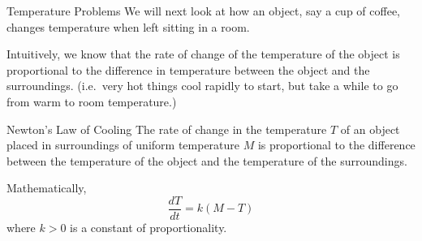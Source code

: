 \documentclass{beamer}
\begin{document}
\begin{frame}
\begin{block}{Temperature Problems}
We will next look at how an object, say a cup of coffee, changes temperature when left sitting in a room.\pause

\vspace{2mm}
Intuitively, we know that the rate of change of the temperature  of the object is proportional to the difference in temperature between the object and the surroundings. (i.e.\ very hot things cool rapidly to start, but take a while to go from warm to room temperature.)
\end{block}\pause

\begin{block}{Newton's Law of Cooling}
The rate of change in the temperature $T$ of an object placed in surroundings of uniform temperature $M$ is proportional to the difference between the temperature of the object and the temperature of the surroundings.

\vspace{2mm}
Mathematically,
\begin{equation*}
\dfrac{dT}{dt} = k(M-T)
\end{equation*}
where $k>0$ is a constant of proportionality.
\end{block}
\end{frame}
\end{document}
